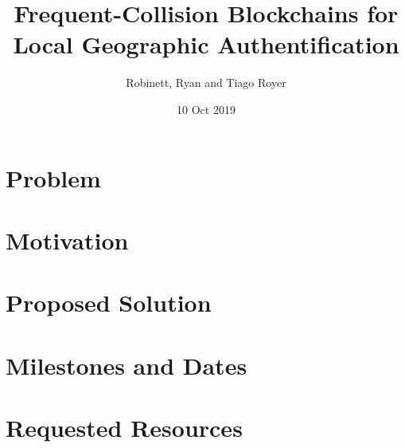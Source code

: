 \documentclass{article}
\title{Frequent-Collision Blockchains for Local Geographic Authentification}
\author{Robinett, Ryan and Tiago Royer}
\date{10 Oct 2019}
\begin{document}
\maketitle

\section*{Problem}

\section*{Motivation}

\section*{Proposed Solution}

\section*{Milestones and Dates}

\section*{Requested Resources}
\end{document}
